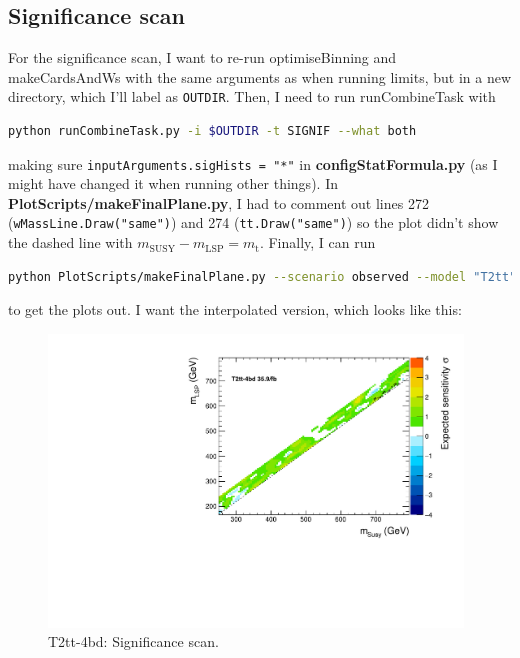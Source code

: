 \subsection{Significance scan}

For the significance scan, I want to re-run optimiseBinning and makeCardsAndWs with the same arguments as when running limits, but in a new directory, which I'll label as \texttt{OUTDIR}. Then, I need to run runCombineTask with

\begin{lstlisting}[belowskip=-0.7cm, language=sh, numbers=none]
python runCombineTask.py -i $OUTDIR -t SIGNIF --what both
\end{lstlisting}

making sure \texttt{inputArguments.sigHists = "*"} in \textbf{configStatFormula.py} (as I might have changed it when running other things). In \textbf{PlotScripts/makeFinalPlane.py}, I had to comment out lines 272 (\texttt{wMassLine.Draw("same")}) and 274 (\texttt{tt.Draw("same")}) so the plot didn't show the dashed line with $m_{\mathrm{SUSY}} - m_{\mathrm{LSP}} = m_{\mathrm{t}}$.  Finally, I can run

\begin{lstlisting}[belowskip=-0.7cm, language=sh, numbers=none]
python PlotScripts/makeFinalPlane.py --scenario observed --model "T2tt" -i $OUTDIR -o <output dir for plots> --mode pv --doubleTranspose --remake --remakePickle --smooth --task SIGNIF
\end{lstlisting}

to get the plots out. I want the interpolated version, which looks like this:

\begin{figure}[H]
\centering
\includegraphics[width=110mm]{./sec31/Significance_scan.pdf}
\caption{T2tt-4bd: Significance scan.}
\end{figure}

